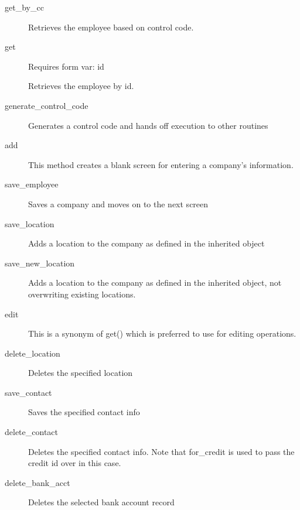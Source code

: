 \begin{description}
\begin{description}
\item[{get\_by\_cc}] \mbox{}

Retrieves the employee based on control code.


\item[{get}] \mbox{}

Requires form var: id



Retrieves the employee by id.


\item[{generate\_control\_code}] \mbox{}

Generates a control code and hands off execution to other routines


\item[{add}] \mbox{}

This method creates a blank screen for entering a company's information.


\item[{save\_employee}] \mbox{}

Saves a company and moves on to the next screen


\item[{save\_location}] \mbox{}

Adds a location to the company as defined in the inherited object


\item[{save\_new\_location}] \mbox{}

Adds a location to the company as defined in the inherited object, not
overwriting existing locations.


\item[{edit}] \mbox{}

This is a synonym of get() which is preferred to use for editing operations.


\item[{delete\_location}] \mbox{}

Deletes the specified location


\item[{save\_contact}] \mbox{}

Saves the specified contact info


\item[{delete\_contact}] \mbox{}

Deletes the specified contact info.  Note that for\_credit is used to pass the 
credit id over in this case.


\item[{delete\_bank\_acct}] \mbox{}

Deletes the selected bank account record




\end{description}
\end{description}
